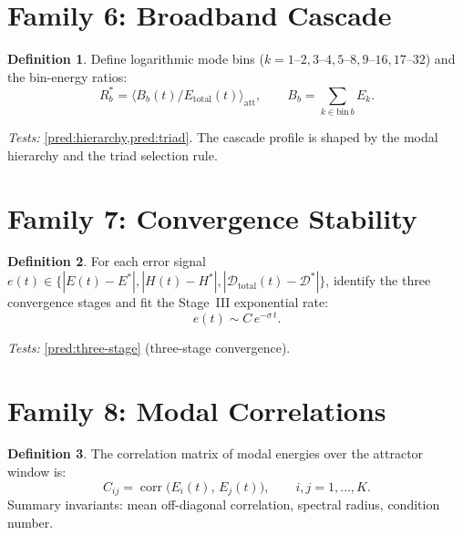 \documentclass[11pt,twoside,openright]{book}
\theoremstyle{definition}
\newtheorem{definition}{Definition}[chapter]
\theoremstyle{plain}
\theoremstyle{definition}
\theoremstyle{remark}
\newcommand{\Dtotal}{\mathcal{D}_{\mathrm{total}}}
\newcommand{\att}{\mathrm{att}}
\DeclareMathOperator{\corr}{corr}
\begin{document}
\section{Family 6: Broadband Cascade}\label{sec:fam-cascade}

\begin{definition}\label{def:cascade}
Define logarithmic mode bins (\(k = 1\text{--}2, 3\text{--}4, 5\text{--}8, 9\text{--}16, 17\text{--}32\)) and the bin-energy ratios:
\begin{equation}\label{eq:cascade}
R_b^* = \bigl\langle B_b(t) / E_{\mathrm{total}}(t) \bigr\rangle_\att, \qquad B_b = \sum_{k \in \mathrm{bin}\,b} E_k.
\end{equation}
\end{definition}

\noindent\emph{Tests:} \cref{pred:hierarchy,pred:triad}. The cascade profile is shaped by the modal hierarchy and the triad selection rule.

\section{Family 7: Convergence Stability}\label{sec:fam-convergence}

\begin{definition}\label{def:convergence}
For each error signal \(e(t) \in \{|E(t) - E^*|, |H(t) - H^*|, |\Dtotal(t) - \mathcal{D}^*|\}\), identify the three convergence stages and fit the Stage~III exponential rate:
\begin{equation}\label{eq:convergence}
e(t) \sim C\,e^{-\sigma\,t}.
\end{equation}
\end{definition}

\noindent\emph{Tests:} \cref{pred:three-stage} (three-stage convergence).

\section{Family 8: Modal Correlations}\label{sec:fam-corr}

\begin{definition}\label{def:modal-corr}
The correlation matrix of modal energies over the attractor window is:
\begin{equation}\label{eq:modal-corr}
C_{ij} = \corr\bigl(E_i(t),\, E_j(t)\bigr), \qquad i, j = 1, \ldots, K.
\end{equation}
Summary invariants: mean off-diagonal correlation, spectral radius, condition number.
\end{definition}
\end{document}
